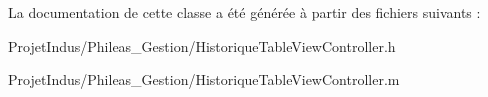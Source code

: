 La documentation de cette classe a été générée à partir des fichiers suivants \+:\begin{DoxyCompactItemize}
\item 
Projet\+Indus/\+Phileas\+\_\+\+Gestion/Historique\+Table\+View\+Controller.\+h\item 
Projet\+Indus/\+Phileas\+\_\+\+Gestion/Historique\+Table\+View\+Controller.\+m\end{DoxyCompactItemize}
